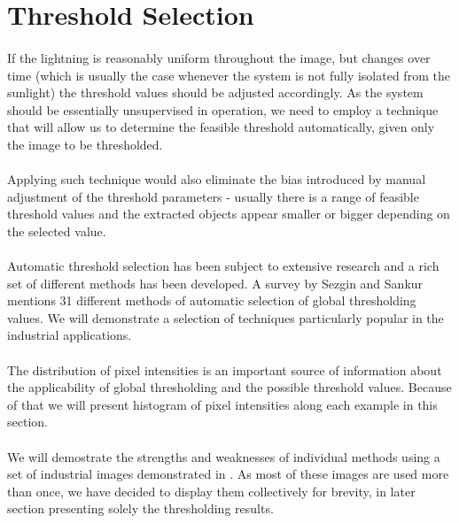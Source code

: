 \section{Threshold Selection}

\paragraph*{}
If the lightning is reasonably uniform throughout the image, but changes over time (which is usually the case whenever the system is not fully isolated from the sunlight) the threshold values should be adjusted accordingly. As the system should be essentially unsupervised in operation, we need to employ a technique that will allow us to determine the feasible threshold automatically, given only the image to be thresholded.

\paragraph*{}
Applying such technique would also eliminate the bias introduced by manual adjustment of the threshold parameters - usually there is a range of feasible threshold values and the extracted objects appear smaller or bigger depending on the selected value.

\paragraph*{}
Automatic threshold selection has been subject to extensive research and a rich set of different methods has been developed. A survey\cite{SezginSankur04} by Sezgin and Sankur mentions 31 different methods of automatic selection of global thresholding values. We will demonstrate a selection of techniques particularly popular in the industrial applications.

\paragraph*{}
The distribution of pixel intensities is an important source of information about the applicability of global thresholding and the possible threshold values. Because of that we will present histogram of pixel intensities along each example in this section.

\paragraph*{}
We will demostrate the strengths and weaknesses of individual methods using a set of industrial images demonstrated in . As most of these images are used more than once, we have decided to display them collectively for brevity, in later section presenting solely the thresholding results.

